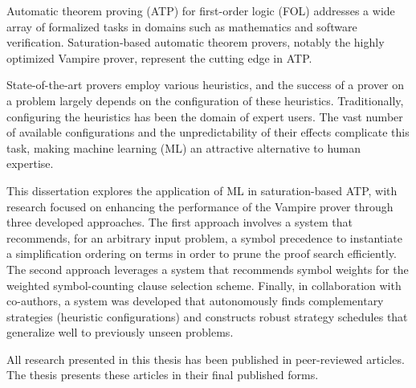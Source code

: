 Automatic theorem proving (ATP) for first-order logic (FOL) addresses a wide array of formalized tasks in domains such as mathematics and software verification. Saturation-based automatic theorem provers, notably the highly optimized Vampire prover, represent the cutting edge in ATP.

State-of-the-art provers employ various heuristics, and the success of a prover on a problem largely depends on the configuration of these heuristics. Traditionally, configuring the heuristics has been the domain of expert users. The vast number of available configurations and the unpredictability of their effects complicate this task, making machine learning (ML) an attractive alternative to human expertise.

This dissertation explores the application of ML in saturation-based ATP, with research focused on enhancing the performance of the Vampire prover through three developed approaches. The first approach involves a system that recommends, for an arbitrary input problem, a symbol precedence to instantiate a simplification ordering on terms in order to prune the proof search efficiently. The second approach leverages a system that recommends symbol weights for the weighted symbol-counting clause selection scheme. Finally, in collaboration with co-authors, a system was developed that autonomously finds complementary strategies (heuristic configurations) and constructs robust strategy schedules that generalize well to previously unseen problems.

All research presented in this thesis has been published in peer-reviewed articles. The thesis presents these articles in their final published forms.
